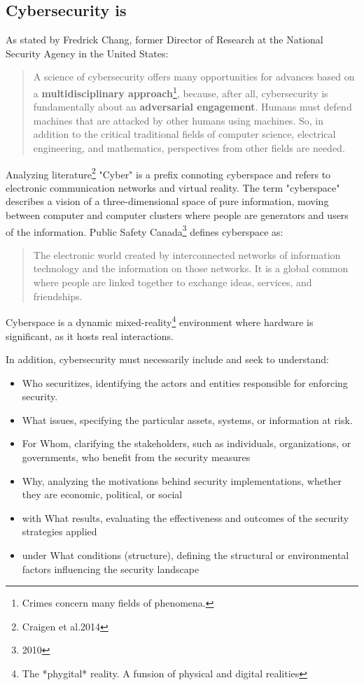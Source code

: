\subsection{Cybersecurity is}

As stated by Fredrick Chang, former Director of Research at the National Security Agency in the United States:
\begin{quotation}
    A science of cybersecurity offers many opportunities for advances based on a \textbf{multidisciplinary approach}\footnote{Crimes concern many fields of phenomena.}, because, after all, cybersecurity is fundamentally about an \textbf{adversarial engagement}. Humans must defend machines that are attacked by other humans using machines. So, in addition to the critical traditional fields of computer science, electrical engineering, and mathematics, perspectives from other fields are needed.
\end{quotation}

Analyzing literature\footnote{Craigen et al.2014} "Cyber" is a prefix connoting cyberspace and refers to electronic communication networks and virtual reality.
The term "cyberspace" describes a vision of a three-dimensional space of pure information, moving between computer and computer clusters where people are generators and users of the information. Public Safety Canada\footnote{2010} defines cyberspace as:

\begin{quotation}
    The electronic world created by interconnected networks of information technology and the information on those networks. It is a global common where people are linked together to exchange ideas, services, and friendships.
\end{quotation} 

Cyberspace is a dynamic mixed-reality\footnote{The *phygital* reality. A funsion of physical and digital realities} environment where hardware is significant, as it hosts real interactions. 

\vspace{0.5cm}

\noindent In addition, cybersecurity must necessarily include and seek to understand:
\begin{itemize}
    \item Who securitizes, identifying the actors and entities responsible for enforcing security.
    \item What issues, specifying the particular assets, systems, or information at risk.
    \item For Whom, clarifying the stakeholders, such as individuals, organizations, or governments, who benefit from the security measures
    \item Why, analyzing the motivations behind security implementations, whether they are economic, political, or social
    \item with What results, evaluating the effectiveness and outcomes of the security strategies applied
    \item under What conditions (structure), defining the structural or environmental factors influencing the security landscape
    \end{itemize}

